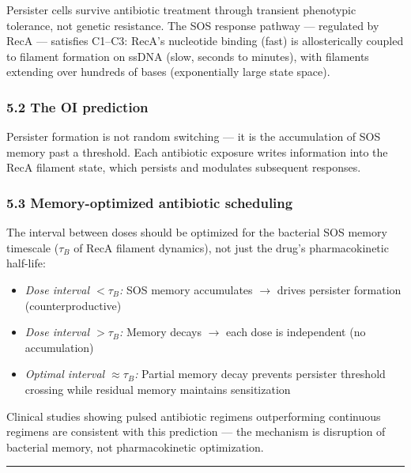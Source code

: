 \documentclass[
]{article}
\providecommand{\tightlist}{%
  \setlength{\itemsep}{0pt}\setlength{\parskip}{0pt}}
\begin{document}
Persister cells survive antibiotic treatment through transient
phenotypic tolerance, not genetic resistance. The SOS response pathway
--- regulated by RecA --- satisfies C1--C3: RecA's nucleotide binding
(fast) is allosterically coupled to filament formation on ssDNA (slow,
seconds to minutes), with filaments extending over hundreds of bases
(exponentially large state space).

\hypertarget{the-oi-prediction-1}{%
\subsubsection{5.2 The OI prediction}\label{the-oi-prediction-1}}

Persister formation is not random switching --- it is the accumulation
of SOS memory past a threshold. Each antibiotic exposure writes
information into the RecA filament state, which persists and modulates
subsequent responses.

\hypertarget{memory-optimized-antibiotic-scheduling}{%
\subsubsection{5.3 Memory-optimized antibiotic
scheduling}\label{memory-optimized-antibiotic-scheduling}}

The interval between doses should be optimized for the bacterial SOS
memory timescale (\(\tau_B\) of RecA filament dynamics), not just the
drug's pharmacokinetic half-life:

\begin{itemize}
\tightlist
\item
  \emph{Dose interval \(< \tau_B\):} SOS memory accumulates \(\to\)
  drives persister formation (counterproductive)
\item
  \emph{Dose interval \(> \tau_B\):} Memory decays \(\to\) each dose is
  independent (no accumulation)
\item
  \emph{Optimal interval \(\approx \tau_B\):} Partial memory decay
  prevents persister threshold crossing while residual memory maintains
  sensitization
\end{itemize}

Clinical studies showing pulsed antibiotic regimens outperforming
continuous regimens are consistent with this prediction --- the
mechanism is disruption of bacterial memory, not pharmacokinetic
optimization.

\begin{center}\rule{0.5\linewidth}{0.5pt}\end{center}
\end{document}
